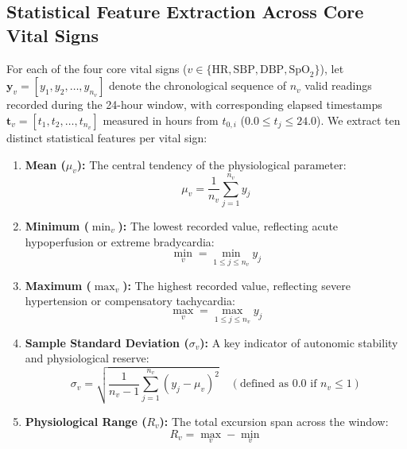 \documentclass[12pt,a4paper,oneside]{report}
\begin{document}
\subsection{Statistical Feature Extraction Across Core Vital Signs}
\label{subsec:stat_features}

For each of the four core vital signs ($v \in \{\text{HR}, \text{SBP}, \text{DBP}, \text{SpO}_2\}$), let $\mathbf{y}_v = [y_1, y_2, \dots, y_{n_v}]$ denote the chronological sequence of $n_v$ valid readings recorded during the 24-hour window, with corresponding elapsed timestamps $\mathbf{t}_v = [t_1, t_2, \dots, t_{n_v}]$ measured in hours from $t_{0, i}$ ($0.0 \le t_j \le 24.0$). We extract ten distinct statistical features per vital sign:

\begin{enumerate}
    \item \textbf{Mean ($\mu_v$):} The central tendency of the physiological parameter:
    \begin{equation}
    \mu_v = \frac{1}{n_v} \sum_{j=1}^{n_v} y_j
    \end{equation}
    
    \item \textbf{Minimum ($\min_v$):} The lowest recorded value, reflecting acute hypoperfusion or extreme bradycardia:
    \begin{equation}
    \min_v = \min_{1 \le j \le n_v} y_j
    \end{equation}
    
    \item \textbf{Maximum ($\max_v$):} The highest recorded value, reflecting severe hypertension or compensatory tachycardia:
    \begin{equation}
    \max_v = \max_{1 \le j \le n_v} y_j
    \end{equation}
    
    \item \textbf{Sample Standard Deviation ($\sigma_v$):} A key indicator of autonomic stability and physiological reserve:
    \begin{equation}
    \sigma_v = \sqrt{\frac{1}{n_v - 1} \sum_{j=1}^{n_v} (y_j - \mu_v)^2} \quad (\text{defined as } 0.0 \text{ if } n_v \le 1)
    \end{equation}
    
    \item \textbf{Physiological Range ($R_v$):} The total excursion span across the window:
    \begin{equation}
    R_v = \max_v - \min_v
    \end{equation}
    

\end{enumerate}
\end{document}
